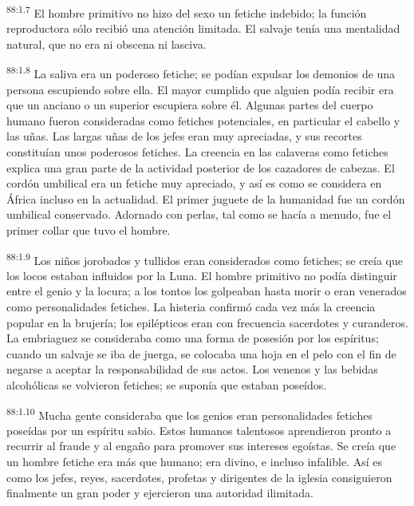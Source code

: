\par
\textsuperscript{88:1.7} El hombre primitivo no hizo del sexo un fetiche indebido; la función reproductora sólo recibió una atención limitada. El salvaje tenía una mentalidad natural, que no era ni obscena ni lasciva.

\par
\textsuperscript{88:1.8} La saliva era un poderoso fetiche; se podían expulsar los demonios de una persona escupiendo sobre ella. El mayor cumplido que alguien podía recibir era que un anciano o un superior escupiera sobre él. Algunas partes del cuerpo humano fueron consideradas como fetiches potenciales, en particular el cabello y las uñas. Las largas uñas de los jefes eran muy apreciadas, y sus recortes constituían unos poderosos fetiches. La creencia en las calaveras como fetiches explica una gran parte de la actividad posterior de los cazadores de cabezas. El cordón umbilical era un fetiche muy apreciado, y así es como se considera en África incluso en la actualidad. El primer juguete de la humanidad fue un cordón umbilical conservado. Adornado con perlas, tal como se hacía a menudo, fue el primer collar que tuvo el hombre.

\par
\textsuperscript{88:1.9} Los niños jorobados y tullidos eran considerados como fetiches; se creía que los locos estaban influidos por la Luna. El hombre primitivo no podía distinguir entre el genio y la locura; a los tontos los golpeaban hasta morir o eran venerados como personalidades fetiches. La histeria confirmó cada vez más la creencia popular en la brujería; los epilépticos eran con frecuencia sacerdotes y curanderos. La embriaguez se consideraba como una forma de posesión por los espíritus; cuando un salvaje se iba de juerga, se colocaba una hoja en el pelo con el fin de negarse a aceptar la responsabilidad de sus actos. Los venenos y las bebidas alcohólicas se volvieron fetiches; se suponía que estaban poseídos.

\par
\textsuperscript{88:1.10} Mucha gente consideraba que los genios eran personalidades fetiches poseídas por un espíritu sabio. Estos humanos talentosos aprendieron pronto a recurrir al fraude y al engaño para promover sus intereses egoístas. Se creía que un hombre fetiche era más que humano; era divino, e incluso infalible. Así es como los jefes, reyes, sacerdotes, profetas y dirigentes de la iglesia consiguieron finalmente un gran poder y ejercieron una autoridad ilimitada.

